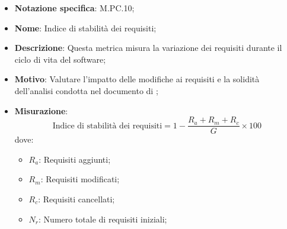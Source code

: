 \begin{itemize}
    \item \textbf{Notazione specifica}: M.PC.10;
    \item \textbf{Nome}: Indice di stabilità dei requisiti;
    \item \textbf{Descrizione}: Questa metrica misura la variazione dei requisiti durante il ciclo di vita del software;
    \item \textbf{Motivo}: Valutare l'impatto delle modifiche ai requisiti e la solidità dell'analisi condotta nel documento di \VersioneAR;
    \item \textbf{Misurazione}:
    \[
        \text{Indice di stabilità dei requisiti} = 1 - \frac{R_a + R_m + R_c}{G}  \times 100
    \]
    dove:
    \begin{itemize}
      \item $R_{a}$: Requisiti aggiunti;
      \item $R_{m}$: Requisiti modificati;
      \item $R_{c}$: Requisiti cancellati;
      \item $N_{r}$: Numero totale di requisiti iniziali;
    \end{itemize}
\end{itemize}

